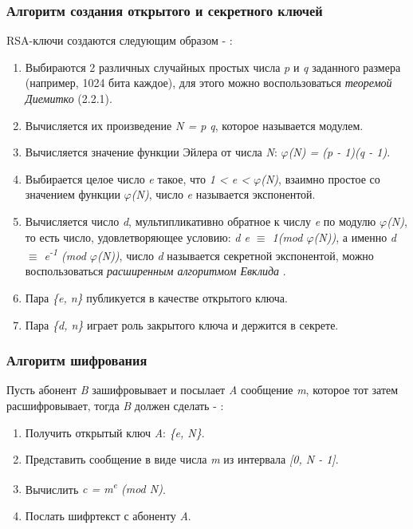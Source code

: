   \subsubsection{Алгоритм создания открытого и секретного ключей}
  RSA-ключи создаются следующим образом - \cite[Глава 9, страницы 148-155]{tilb06}:
  
    \begin{enumerate}
     \item Выбираются 2 различных случайных простых числа \textit{p} и \textit{q} заданного размера (например, 1024 бита каждое), для этого
      можно воспользоваться \textit{теоремой Диемитко} (2.2.1).
     \item Вычисляется их произведение \textit{N = p q}, которое называется модулем.
     \item Вычисляется значение функции Эйлера от числа \textit{N}: \textit{{$\varphi$}(N) = (p - 1)(q - 1)}.
     \item Выбирается целое число \textit{e} такое, что \textit{1 < e < {$\varphi$}(N)}, взаимно простое со значением функции \textit{{$\varphi$}(N)}, 
     число \textit{e} называется экспонентой.
     \item Вычисляется число \textit{d}, мультипликативно обратное к числу \textit{e} по модулю \textit{{$\varphi$}(N)}, то есть число, удовлетворяющее 
     условию: \textit{d e {$\equiv$} 1(mod {$\varphi$}(N))}, а именно \textit{d {$\equiv$} e\textsuperscript{-1} (mod {$\varphi$}(N))}, число \textit{d} 
     называется секретной экспонентой, можно воспользоваться \textit{расширенным алгоритмом Евклида} \cite[Глава 1.8, страницы 23-25]{ish11}.
     \item Пара \textit{\{e, n\}} публикуется в качестве открытого ключа.
     \item Пара \textit{\{d, n\}} играет роль закрытого ключа и держится в секрете.
    \end{enumerate}

  \subsubsection{Алгоритм шифрования}
  Пусть абонент \textit{B} зашифровывает и посылает \textit{A} сообщение \textit{m}, которое тот затем расшифровывает, тогда \textit{B} должен сделать
  - \cite[Глава 9, страницы 148-155]{tilb06}:
  
    \begin{enumerate}
     \item Получить открытый ключ \textit{A}: \textit{\{e, N\}}.
     \item Представить сообщение в виде числа \textit{m} из интервала \textit{[0, N - 1]}.
     \item Вычислить \textit{c = m\textsuperscript{e} (mod N)}.
     \item Послать шифртекст с абоненту \textit{A}.
    \end{enumerate}
  
